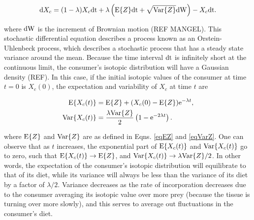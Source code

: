 \documentclass{frontiersSCNS}
\begin{document}
\begin{equation}
\label{eqSDE}
{\rm d}X_c = (1-\lambda)X_c{\rm dt} + \lambda\left({\rm E}\{Z\}{\rm dt} + \sqrt{{\rm Var}\{Z\}}{\rm dW}\right) - X_c{\rm dt}.
\end{equation}

\noindent where ${\rm dW}$ is the increment of Brownian motion (REF MANGEL).
This stochastic differential equation describes a process known as an Orstein-Uhlenbeck process, which describes a stochastic process that has a steady state variance around the mean.
Because the time interval ${\rm dt}$ is infinitely short at the continuous limit, the consumer's isotopic distribution will have a Gaussian density (REF).
In this case, if the initial isotopic values of the consumer at time $t=0$ is $X_c(0)$, the expectation and variability of $X_c$ at time $t$ are

\begin{align}
  \begin{split}
    \label{eqEVar}
{\rm E}\{X_c(t)\} &= {\rm E}\{Z\} + (X_c(0) - {\rm E}\{Z\}){\rm e}^{-\lambda t},\\
{\rm Var}\{X_c(t)\} &= \frac{\lambda {\rm Var}\{Z\}}{2}\left(1 - {\rm e}^{-2\lambda t}\right).
\end{split}
\end{align}

\noindent where ${\rm E}\{Z\}$ and ${\rm Var}\{Z\}$ are as defined in Eqns. \ref{eqEZ} and \ref{eqVarZ}.
One can observe that as $t$ increases, the exponential part of ${\rm E}\{X_c(t)\}$ and ${\rm Var}\{X_c(t)\}$ go to zero, such that ${\rm E}\{X_c(t)\} \to {\rm E}\{Z\}$, and ${\rm Var}\{X_c(t)\} \to \lambda{\rm Var}\{Z\}/2$.
In other words, the expectation of the consumer's isotopic distribution will equilibrate to that of its diet, while its variance will always be less than the variance of its diet by a factor of $\lambda/2$.
Variance decreases as the rate of incorporation decreases due to the consumer averaging its isotopic value over more prey (because the tissue is turning over more slowly), and this serves to average out fluctuations in the consumer's diet.




\end{document}
